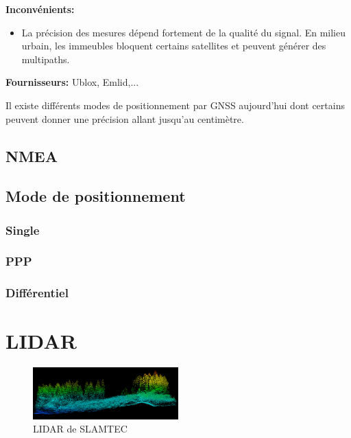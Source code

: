 \documentclass[a4paper, 11pt]{report}
\begin{document}
\textbf{Inconvénients:}
\begin{itemize}
\item La précision des mesures dépend fortement de la qualité du signal. En milieu urbain, les immeubles bloquent certains satellites et peuvent générer des multipaths.
\end{itemize}

\textbf{Fournisseurs:} Ublox, Emlid,...

Il existe différents modes de positionnement par GNSS aujourd'hui dont certains peuvent donner une  précision allant jusqu'au centimètre.

\subsection{NMEA}

\subsection{Mode de positionnement}

\subsubsection{Single}

\subsubsection{PPP}

\subsubsection{Différentiel}


\section{LIDAR}

\begin{figure}[h!]
\begin{centering}
\includegraphics[width=0.5\textwidth]{images/NuageDePoints.png}
\caption{LIDAR de SLAMTEC}
\par\end{centering}
\end{figure}
\end{document}
